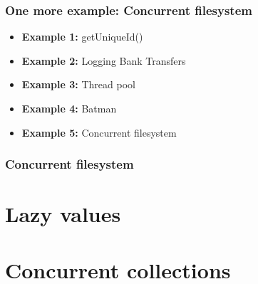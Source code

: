 \documentclass[aspectratio=169]{beamer}
\begin{document}
\begin{frame}\frametitle{One more example: Concurrent filesystem}
    \begin{itemize}
      \item \textbf{Example 1:} getUniqueId()
      \item \textbf{Example 2:} Logging Bank Transfers
      \item \textbf{Example 3:} Thread pool
      \item \textbf{Example 4:} Batman
      \item \alert{\textbf{Example 5:} Concurrent filesystem}
    \end{itemize}
\end{frame}


\begin{frame}\frametitle{Concurrent filesystem}
    

\end{frame}

\section{Lazy values}


\section{Concurrent collections}
\end{document}
